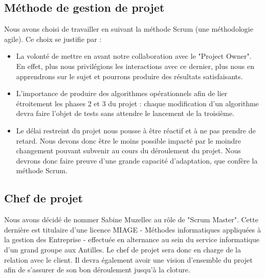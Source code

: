 \documentclass{article}
\begin{document}
\subsection{Méthode de gestion de projet}
Nous avons choisi de travailler en suivant la méthode Scrum (une méthodologie agile). Ce choix se justifie par :
\begin{itemize}
    \item La volonté de mettre en avant notre collaboration avec le "Project Owner". En effet, plus nous privilégions les interactions avec ce dernier, plus nous en apprendrons sur le sujet et pourrons produire des résultats satisfaisants.
    \item L'importance de produire des algorithmes opérationnels afin de lier étroitement les phases 2 et 3 du projet : chaque modification d'un algorithme devra faire l'objet de tests sans attendre le lancement de la troisième.
    \item Le délai restreint du projet nous pousse à être réactif et à ne pas prendre de retard. Nous devons donc être le moins possible impacté par le moindre changement pouvant subvenir au cours du déroulement du projet. Nous devrons donc faire preuve d'une grande capacité d'adaptation, que confère la méthode Scrum.
\end{itemize}

\subsection{Chef de projet}
Nous avons décidé de nommer Sabine Muzellec au rôle de "Scrum Master". Cette dernière est titulaire d'une licence MIAGE - Méthodes informatiques appliquées à la gestion des Entreprise - effectuée en alternance au sein du service informatique d'un grand groupe aux Antilles. Le chef de projet sera donc en charge de la relation avec le client. Il devra également avoir une vision d'ensemble du projet afin de s'assurer de son bon déroulement jusqu'à la cloture.
\end{document}
